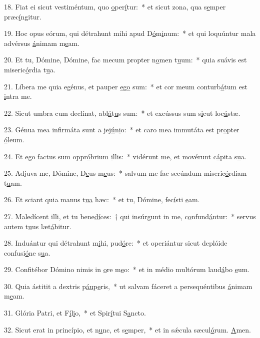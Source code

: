 18. Fiat ei sicut vestiméntum, quo \uline{o}per\uline{í}tur:~* et sicut zona, qua s\uline{e}mper præc\uline{í}ngitur.\par 
19. Hoc opus eórum, qui détrahunt mihi apud D\uline{ó}m\uline{i}num:~* et qui loquúntur mala advérsus \uline{á}nimam m\uline{e}am.\par 
20. Et tu, Dómine, Dómine, fac mecum propter n\uline{o}men t\uline{u}um:~* quia suávis est miseric\uline{ó}rdia t\uline{u}a.\par 
21. Líbera me quia egénus, et pauper \uline{e}g\uline{o} sum:~* et cor meum conturb\uline{á}tum est \uline{i}ntra me.\par 
22. Sicut umbra cum declínat, abl\uline{á}t\uline{u}s sum:~* et excússus sum s\uline{i}cut loc\uline{ú}stæ.\par 
23. Génua mea infirmáta sunt a jej\uline{ú}n\uline{i}o:~* et caro mea immutáta est pr\uline{o}pter \uline{ó}leum.\par 
24. Et ego factus sum oppr\uline{ó}brium \uline{i}llis:~* vidérunt me, et movérunt c\uline{á}pita s\uline{u}a.\par 
25. Adjuva me, Dómine, D\uline{e}us m\uline{e}us:~* salvum me fac secúndum miseric\uline{ó}rdiam t\uline{u}am.\par 
26. Et sciant quia manus t\uline{u}\uline{a} hæc:~* et tu, Dómine, fec\uline{í}sti \uline{e}am.\par 
27. Maledícent illi, et tu bene\uline{dí}ces:~† qui insúrgunt in me, c\uline{o}nfund\uline{á}ntur:~* servus autem t\uline{u}us læt\uline{á}bitur.\par 
28. Induántur qui détrahunt m\uline{i}hi, pud\uline{ó}re:~* et operiántur sicut deplóide confusi\uline{ó}ne s\uline{u}a.\par 
29. Confitébor Dómino nimis in \uline{o}re m\uline{e}o:~* et in médio multórum laud\uline{á}bo \uline{e}um.\par 
30. Quia ástitit a dextris p\uline{áu}p\uline{e}ris,~* ut salvam fáceret a persequéntibus \uline{á}nimam m\uline{e}am.\par 
31. Glória Patri, et F\uline{í}l\uline{i}o,~* et Spir\uline{í}tui S\uline{a}ncto.\par 
32. Sicut erat in princípio, et n\uline{u}nc, et s\uline{e}mper,~* et in sǽcula sæcul\uline{ó}rum. \uline{A}men.\par 
